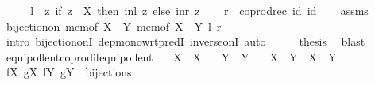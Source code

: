 \begin{isabellebody}
%
\endisadelimproof
%
\isatagproof
{}\isamarkupfalse%
\ {\isacharminus}{\kern0pt}\isanewline
\ \ \isamarkupfalse%
\ {\isacharquery}{\kern0pt}l\ {\isacharequal}{\kern0pt}\ {\isachardoublequoteopen}{\isasymlambda}z{\isachardot}{\kern0pt}\ if\ z\ {\isasymin}\ X\ then\ inl\ z\ else\ inr\ z{\isachardoublequoteclose}\isanewline
\ \ \isamarkupfalse%
\ {\isacharquery}{\kern0pt}r\ {\isacharequal}{\kern0pt}\ {\isachardoublequoteopen}coprod{\isacharunderscore}{\kern0pt}rec\ id\ id{\isachardoublequoteclose}\isanewline
\ \ \isamarkupfalse%
\ assms\ \isamarkupfalse%
\ {\isachardoublequoteopen}bijection{\isacharunderscore}{\kern0pt}on\ {\isacharparenleft}{\kern0pt}mem{\isacharunderscore}{\kern0pt}of\ {\isacharparenleft}{\kern0pt}X\ {\isasymunion}\ Y{\isacharparenright}{\kern0pt}{\isacharparenright}{\kern0pt}\ {\isacharparenleft}{\kern0pt}mem{\isacharunderscore}{\kern0pt}of\ {\isacharparenleft}{\kern0pt}X\ {\isasymCoprod}\ Y{\isacharparenright}{\kern0pt}{\isacharparenright}{\kern0pt}\ {\isacharquery}{\kern0pt}l\ {\isacharquery}{\kern0pt}r{\isachardoublequoteclose}\isanewline
\ \ \ \ \isamarkupfalse%
\ {\isacharparenleft}{\kern0pt}intro\ bijection{\isacharunderscore}{\kern0pt}onI\ dep{\isacharunderscore}{\kern0pt}mono{\isacharunderscore}{\kern0pt}wrt{\isacharunderscore}{\kern0pt}predI\ inverse{\isacharunderscore}{\kern0pt}onI{\isacharparenright}{\kern0pt}\ auto\isanewline
\ \ \isamarkupfalse%
\ \isamarkupfalse%
\ {\isacharquery}{\kern0pt}thesis\ \isamarkupfalse%
\ blast\isanewline
{}\isamarkupfalse%
%
\endisatagproof
{\isafoldproof}%
%
\isadelimproof
\isanewline
%
\endisadelimproof
\isanewline
{}\isamarkupfalse%
\ equipollent{\isacharunderscore}{\kern0pt}coprod{\isacharunderscore}{\kern0pt}if{\isacharunderscore}{\kern0pt}equipollent{\isacharcolon}{\kern0pt}\isanewline
\ \ \ {\isachardoublequoteopen}X\ {\isasymapprox}\ X{\isacharprime}{\kern0pt}{\isachardoublequoteclose}\isanewline
\ \ \ {\isachardoublequoteopen}Y\ {\isasymapprox}\ Y{\isacharprime}{\kern0pt}{\isachardoublequoteclose}\isanewline
\ \ \ {\isachardoublequoteopen}X\ {\isasymCoprod}\ Y\ {\isasymapprox}\ X{\isacharprime}{\kern0pt}\ {\isasymCoprod}\ Y{\isacharprime}{\kern0pt}{\isachardoublequoteclose}\isanewline
%
\isadelimproof
%
\endisadelimproof
%
\isatagproof
{}\isamarkupfalse%
\ {\isacharminus}{\kern0pt}\isanewline
\ \ \isamarkupfalse%
\ fX\ gX\ fY\ gY\ \ bijections{\isacharcolon}{\kern0pt}\isanewline

\end{isabellebody}
